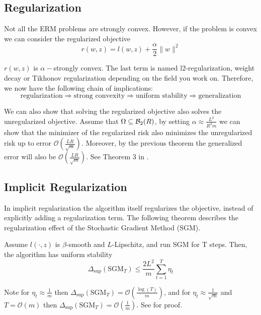 \subsection{Regularization}

Not all the ERM problems are strongly convex. However, if the problem is convex we can consider the regularized objective
\begin{equation*}
r(w, z) = l(w, z) + \frac{\alpha}{2} \| w \|^2
\end{equation*}

$r(w, z)$ is $\alpha-$strongly convex. The last term is named l2-regularization, weight decay or Tikhonov regularization depending on the field you work on. Therefore, we now have the following chain of implications:
$$
\text{regularization} \Rightarrow \text{strong convexity} \Rightarrow \text{uniform stability} \Rightarrow \text{generalization}
$$

We can also show that solving the regularized objective also solves the unregularized objective. Assume that $\Omega \subseteq \mathcal{B}_2(R)$, by setting $\alpha \approx \frac{L^2}{R^2 m}$ we can show that the minimizer of the regularized risk also minimizes the unregularized risk up to error $\mathcal{O}(\frac{LR}{\sqrt{m}})$. Moreover, by the previous theorem the generalized error will also be $\mathcal{O}(\frac{LR}{\sqrt{m}})$. See Theorem 3 in \cite{Shalev2010LearnabilitySA}.

\subsection{Implicit Regularization}

In implicit regularization the algorithm itself regularizes the objective, instead of explicitly adding a regularization term. The following theorem describes the regularization effect of the Stochastic Gradient Method (SGM). 

\begin{theorem}Assume $l(\cdot, z)$ is $\beta$-smooth and $L$-Lipschitz, and run SGM for T steps. Then, the algorithm has uniform stability
\begin{equation*}
\Delta_{\sup}(\text{SGM}_T) \leq \frac{2 L^2}{m} \sum_{t=1}^T \eta_t
\end{equation*}
\end{theorem}
Note for $\eta_t \approx \frac{1}{m}$ then $\Delta_{\sup}(\text{SGM}_T) = \mathcal{O}(\frac{\log(T)}{m})$, and for $\eta_t \approx \frac{1}{\sqrt{m}}$ and $T=\mathcal{O}(m)$ then $\Delta_{\sup}(\text{SGM}_T) = \mathcal{O}(\frac{1}{m} )$. See \cite{HardtRS15} for proof.
